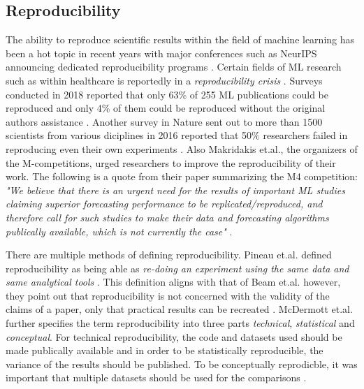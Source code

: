 \subsection{Reproducibility}
The ability to reproduce scientific results within the field of machine learning has been a hot topic in recent years with major conferences such as NeurIPS announcing dedicated reproducibility programs \cite{pineau2020improving}. Certain fields of ML research such as within healthcare is reportedly in a \textit{reproducibility crisis} \cite{beam2020challenges, mcdermott2019reproducibility}. Surveys conducted in 2018 reported that only 63\% of 255 ML publications could be reproduced and only 4\% of them could be reproduced without the original authors assistance \cite{pineau2020improving}. Another survey in Nature sent out to more than 1500 scientists from various diciplines in 2016 reported that 50\% researchers failed in reproducing even their own experiments \cite{baker20161}. Also Makridakis et.al., the organizers of the M-competitions, urged researchers to improve the reproducibility of their work. The following is a quote from their paper summarizing the M4 competition: \textit{"We believe that there is an urgent need for the results of important ML studies claiming superior forecasting performance to be replicated/reproduced, and therefore call for such studies to make their data and forecasting algorithms publically available, which is not currently the case"} \cite{makridakis_m4_2020}.

There are multiple methods of defining reproducibility. Pineau et.al. defined reproducibility as being able as \textit{re-doing an experiment using the same data and same analytical tools} \cite{pineau2020improving}. This definition aligns with that of Beam et.al. however, they point out that reproducibility is not concerned with the validity of the claims of a paper, only that practical results can be recreated \cite{beam2020challenges}. McDermott et.al. further specifies the term reproducibility into three parts \textit{technical}, \textit{statistical} and \textit{conceptual}. For technical reproducibility, the code and datasets used should be made publically available and in order to be statistically reproducible, the variance of the results should be published. To be conceptually reprodicble, it was important that multiple datasets should be used for the comparisons \cite{mcdermott2019reproducibility}.

